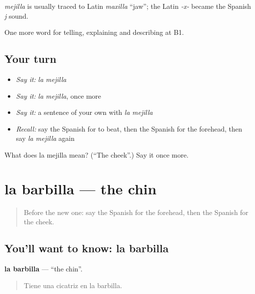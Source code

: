 \begin{cousinweb}
\emph{mejilla} is usually traced to Latin \emph{maxilla} \textquotedblleft{}jaw\textquotedblright{}; the Latin \emph{-x-} became the Spanish \emph{j} sound.
\end{cousinweb}

\begin{grammarlens}[title={What you've built}]
One more word for telling, explaining and describing at B1.
\end{grammarlens}

\subsection*{Your turn}
\begin{itemize}
\raggedright
  \item \emph{Say it:} \emph{la mejilla}
  \item \emph{Say it:} \emph{la mejilla}, once more
  \item \emph{Say it:} a sentence of your own with \emph{la mejilla}
  \item \emph{Recall:} say the Spanish for to beat, then the Spanish for the forehead, then say \emph{la mejilla} again
\end{itemize}

\begin{tcolorbox}[breakable,colback=teal!4,colframe=teal!35!black,title={Before you move on}]
What does la mejilla mean? (\textquotedblleft{}The cheek\textquotedblright{}.) Say it once more.
\end{tcolorbox}
\section[la barbilla]{la barbilla — the chin}

\label{lesson:ES-C736-barbilla}



\begin{quote}
Before the new one: say the Spanish for the forehead, then the Spanish for the cheek.
\end{quote}

\subsection*{You'll want to know: la barbilla}
\textbf{la barbilla} — \textquotedblleft{}the chin\textquotedblright{}.

\begin{quote}
Tiene una cicatriz en la barbilla.
\end{quote}

